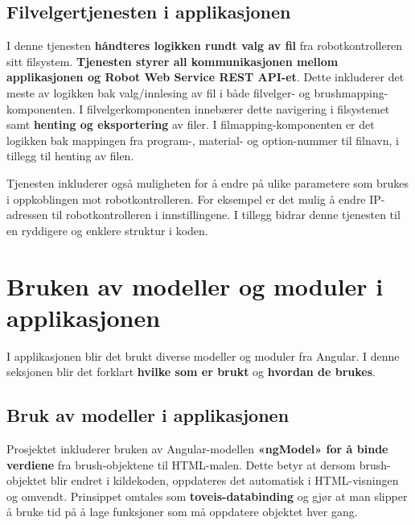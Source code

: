 \subsection{Filvelgertjenesten i applikasjonen}
\label{filvelgerTjenesteRef}
I denne tjenesten \textbf{håndteres logikken rundt valg av fil} fra robotkontrolleren sitt filsystem. \textbf{Tjenesten styrer all kommunikasjonen mellom applikasjonen og Robot Web Service REST API-et}. Dette inkluderer det meste av logikken bak valg/innlesing av fil i både filvelger- og brushmapping-komponenten. I filvelgerkomponenten innebærer dette navigering i filsystemet samt \textbf{henting og eksportering} av filer. I filmapping-komponenten er det logikken bak mappingen fra program-, material- og option-nummer til filnavn, i tillegg til henting av filen. 

Tjenesten inkluderer også muligheten for å endre på ulike parametere som brukes i oppkoblingen mot robotkontrolleren. For eksempel er det mulig å endre IP-adressen til robotkontrolleren i innstillingene. I tillegg bidrar denne tjenesten til en ryddigere og enklere struktur i koden.

\section{Bruken av modeller og moduler i applikasjonen}
I applikasjonen blir det brukt diverse modeller og moduler fra Angular. I denne seksjonen blir det forklart \textbf{hvilke som er brukt} og \textbf{hvordan de brukes}.

\subsection{Bruk av modeller i applikasjonen}
Prosjektet inkluderer bruken av  Angular-modellen \textbf{«ngModel» for å binde verdiene} fra brush-objektene til HTML-malen. Dette betyr at dersom brush-objektet blir endret i kildekoden, oppdateres det automatisk i HTML-visningen og omvendt. Prinsippet omtales som \textbf{toveis-databinding} og gjør at man slipper å bruke tid på å lage funksjoner som må oppdatere objektet hver gang.


